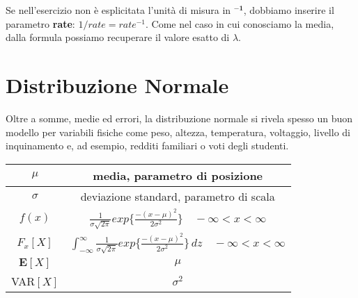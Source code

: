 \begin{tcolorbox}
Se nell'esercizio non è esplicitata l'unità di misura in \(\mathbf{^{-1}}\), dobbiamo inserire il parametro \textbf{rate}: \(1/rate = rate^{-1} \). Come nel caso in cui conosciamo la media, dalla formula possiamo recuperare il valore esatto di $\lambda$.
\end{tcolorbox}

\section{Distribuzione Normale}
\begin{tcolorbox}
Oltre a somme, medie ed errori, la distribuzione normale si rivela spesso un buon modello per variabili fisiche come peso, altezza, temperatura, voltaggio, livello di inquinamento e, ad esempio, redditi familiari o voti degli studenti.
\end{tcolorbox}

\begingroup
\setlength{\tabcolsep}{10pt} %
\renewcommand{\arraystretch}{1.5} %
\begin{center}
\begin{tabular}{ |c|c| } 
\hline
\(\mu\) & media, parametro di posizione \\ \hline
\(\sigma\) & deviazione standard, parametro di scala \\ \hline
\(f(x)\) & $\frac{1}{\sigma \sqrt{2\pi}} exp\Big\{\frac{-(x - \mu)^2}{2\sigma^2}\Big\} \quad -\infty < x < \infty$ \\ \hline
\(F_x[X]\) & $\int_{-\infty}^{\infty} \frac{1}{\sigma \sqrt{2\pi}} exp\Big\{\frac{-(x - \mu)^2}{2\sigma^2}\Big\} \,dz \quad -\infty < x < \infty$ \\ \hline
\(\mathbf{E}[X]\) & \(\mu\) \\ \hline
VAR\([X]\) & \(\sigma^2\) \\ \hline
\end{tabular}
\end{center}
\endgroup

